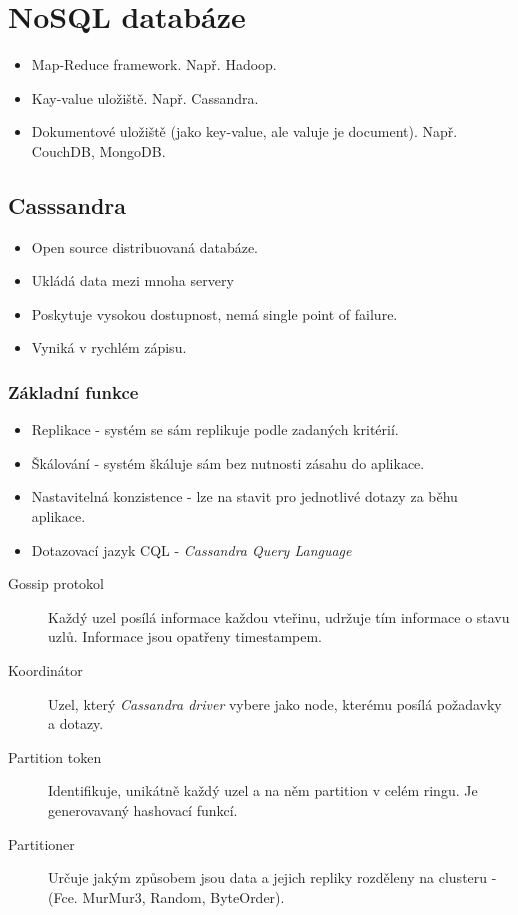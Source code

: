 \documentclass{article}
\begin{document}
\section{NoSQL databáze}
  \begin{itemize}
    \item Map-Reduce framework. Např. Hadoop.
    \item Kay-value uložiště. Např. Cassandra.
    \item Dokumentové uložiště (jako key-value, ale valuje je document). Např. CouchDB, MongoDB.
  \end{itemize}

  \subsection{Casssandra}
    \begin{itemize}
      \item Open source distribuovaná databáze.
      \item Ukládá data mezi mnoha servery
      \item Poskytuje vysokou dostupnost, nemá single point of failure.
      \item Vyniká v rychlém zápisu.
    \end{itemize}

    \subsubsection{Základní funkce}
      \begin{itemize}
        \item Replikace - systém se sám replikuje podle zadaných kritérií.
        \item Škálování - systém škáluje sám bez nutnosti zásahu do aplikace.
        \item Nastavitelná konzistence  - lze na stavit pro jednotlivé dotazy za běhu aplikace.
        \item Dotazovací jazyk CQL - \emph{Cassandra Query Language}
      \end{itemize}

      \begin{description}
        \item[Gossip protokol] Každý uzel posílá informace každou vteřinu, udržuje tím informace o stavu uzlů. Informace jsou opatřeny timestampem.
        \item[Koordinátor] Uzel, který \emph{Cassandra driver} vybere jako node, kterému posílá požadavky a dotazy.
        \item[Partition token] Identifikuje, unikátně každý uzel a na něm partition v celém ringu. Je generovavaný hashovací funkcí.
        \item[Partitioner] Určuje jakým způsobem jsou data a jejich repliky rozděleny na clusteru - (Fce. MurMur3, Random, ByteOrder).
      \end{description}
\end{document}
